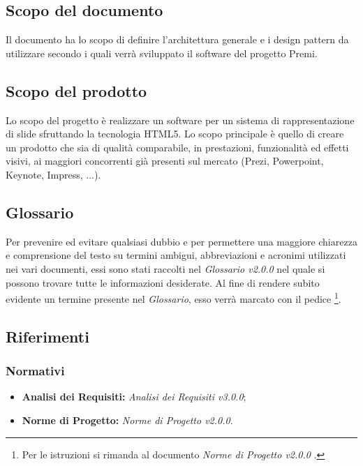 \subsection{Scopo del documento}
	Il documento ha lo scopo di definire l'architettura generale e i \gls{design pattern} da utilizzare secondo i quali verrà sviluppato il software del progetto Premi.

\subsection{Scopo del prodotto}
Lo scopo del progetto è realizzare un software per un sistema di rappresentazione di \gls{slide} sfruttando la tecnologia  \gls{HTML5}. Lo scopo principale è quello di creare un prodotto che sia di qualità comparabile, in prestazioni, funzionalità ed effetti visivi, ai maggiori concorrenti già presenti sul mercato (Prezi, Powerpoint, Keynote, Impress, ...).

\subsection{Glossario}
Per prevenire ed evitare qualsiasi dubbio e per permettere una maggiore chiarezza e comprensione del testo su termini ambigui, abbreviazioni e acronimi utilizzati nei vari documenti, essi sono stati raccolti nel \textit{Glossario v2.0.0} nel quale si possono trovare tutte le informazioni desiderate.
Al fine di rendere subito evidente un termine presente nel \textit{Glossario}, esso verrà marcato con il pedice \G\footnote{Per le istruzioni si rimanda al documento \textit{Norme di Progetto v2.0.0} .}.

\subsection{Riferimenti}

\subsubsection{Normativi}
	\begin{itemize}
		\item \textbf{Analisi dei Requisiti:} \textit{Analisi dei Requisiti v3.0.0};
		\item \textbf{Norme di Progetto:} \textit{Norme di Progetto v2.0.0}.
	\end{itemize}

